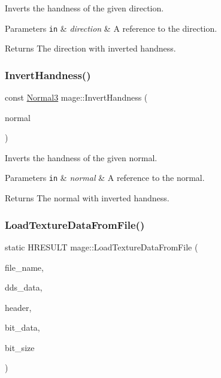 Inverts the handness of the given direction.


\begin{DoxyParams}[1]{Parameters}
\mbox{\tt in}  & {\em direction} & A reference to the direction. \\
\hline
\end{DoxyParams}
\begin{DoxyReturn}{Returns}
The direction with inverted handness. 
\end{DoxyReturn}
\hypertarget{namespacemage_a99775511a838e6d840a83e5ca31e3306}{}\label{namespacemage_a99775511a838e6d840a83e5ca31e3306} 
\subsubsection{\texorpdfstring{Invert\+Handness()}{InvertHandness()}\hspace{0.1cm}{\footnotesize\ttfamily [4/4]}}
{\footnotesize\ttfamily const \hyperlink{structmage_1_1_normal3}{Normal3} mage\+::\+Invert\+Handness (\begin{DoxyParamCaption}\item[{const \hyperlink{structmage_1_1_normal3}{Normal3} \&}]{normal }\end{DoxyParamCaption})}

Inverts the handness of the given normal.


\begin{DoxyParams}[1]{Parameters}
\mbox{\tt in}  & {\em normal} & A reference to the normal. \\
\hline
\end{DoxyParams}
\begin{DoxyReturn}{Returns}
The normal with inverted handness. 
\end{DoxyReturn}
\hypertarget{namespacemage_ad1df9b8a27dd30528717777fd0c9c3db}{}\label{namespacemage_ad1df9b8a27dd30528717777fd0c9c3db} 
\subsubsection{\texorpdfstring{Load\+Texture\+Data\+From\+File()}{LoadTextureDataFromFile()}}
{\footnotesize\ttfamily static H\+R\+E\+S\+U\+LT mage\+::\+Load\+Texture\+Data\+From\+File (\begin{DoxyParamCaption}\item[{\+\_\+\+In\+\_\+z\+\_\+ const wchar\+\_\+t $\ast$}]{file\+\_\+name,  }\item[{std\+::unique\+\_\+ptr$<$ uint8\+\_\+t\mbox{[}$\,$\mbox{]}$>$ \&}]{dds\+\_\+data,  }\item[{\hyperlink{structmage_1_1_d_d_s___h_e_a_d_e_r}{D\+D\+S\+\_\+\+H\+E\+A\+D\+ER} $\ast$$\ast$}]{header,  }\item[{uint8\+\_\+t $\ast$$\ast$}]{bit\+\_\+data,  }\item[{size\+\_\+t $\ast$}]{bit\+\_\+size }\end{DoxyParamCaption})\hspace{0.3cm}{\ttfamily [static]}}

